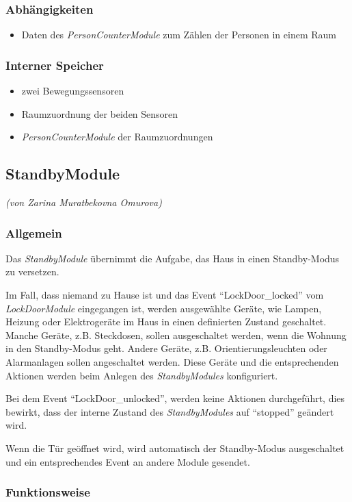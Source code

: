 \subsubsection{Abhängigkeiten}
\begin{itemize}
	\item Daten des \emph{PersonCounterModule} zum Zählen der Personen in einem Raum
\end{itemize}

\subsubsection{Interner Speicher}
\begin{itemize}
	\item zwei Bewegungssensoren
	\item Raumzuordnung der beiden Sensoren
	\item \emph{PersonCounterModule} der Raumzuordnungen
\end{itemize}


\newpage
\subsection{StandbyModule}
\emph{(von Zarina Muratbekovna Omurova)}
\subsubsection{Allgemein}
Das \emph{StandbyModule} übernimmt die Aufgabe, das Haus in einen Standby-Modus zu versetzen.

Im Fall, dass niemand zu Hause ist und das Event "`LockDoor\_locked"' vom \emph{LockDoorModule} eingegangen ist, werden ausgewählte Geräte, wie Lampen, Heizung oder Elektrogeräte im Haus in einen definierten Zustand geschaltet. Manche Geräte, z.B. Steckdosen, sollen ausgeschaltet werden, wenn die Wohnung in den Standby-Modus geht. Andere Geräte, z.B. Orientierungsleuchten oder Alarmanlagen sollen angeschaltet werden. Diese Geräte und die entsprechenden Aktionen werden beim Anlegen des \emph{StandbyModules} konfiguriert.

Bei dem Event "`LockDoor\_unlocked"', werden keine Aktionen durchgeführt, dies bewirkt, dass der interne Zustand des \emph{StandbyModules} auf "`stopped"' geändert wird.

Wenn die Tür geöffnet wird, wird automatisch der Standby-Modus ausgeschaltet und ein entsprechendes Event an andere Module gesendet.

\subsubsection{Funktionsweise}

